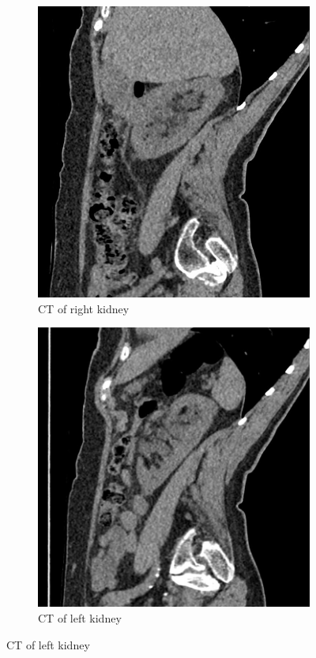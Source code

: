 \documentclass[11pt, ]{article}
\begin{document}
\begin{figure}
\begin{subfigure}{.5\textwidth}
\includegraphics[width=\textwidth]{rtkidct}
\caption{CT of right kidney}
\end{subfigure}
\begin{subfigure}{.5\textwidth}
\includegraphics[width=\textwidth]{ltkidct}
\caption{CT of left kidney}
\end{subfigure}
\end{figure}
\end{document}

